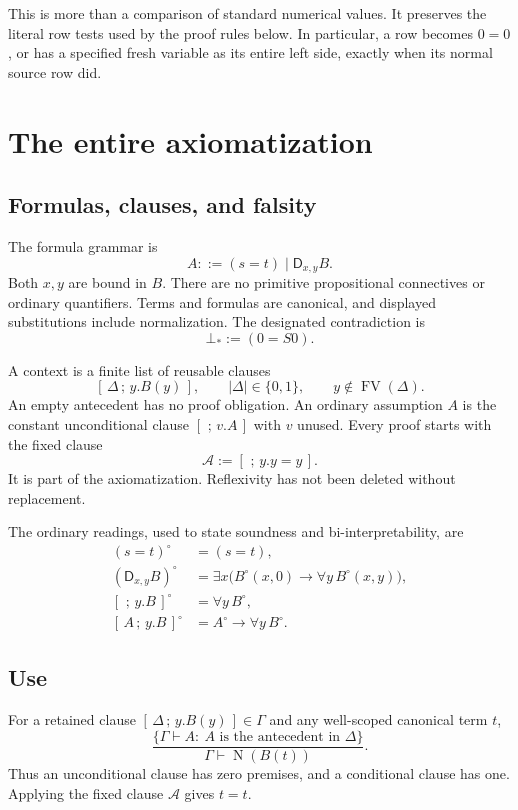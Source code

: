 \documentclass[11pt]{article}
\theoremstyle{definition}
\theoremstyle{remark}
\newcommand{\D}{\mathsf D}
\newcommand{\NF}{\operatorname{N}}
\newcommand{\FV}{\operatorname{FV}}
\newcommand{\der}{\vdash}
\newcommand{\cl}[2]{[\,#1\,;\,#2\,]}
\begin{document}
This is more than a comparison of standard numerical values.
It preserves the literal row tests used by the proof rules
below. In particular, a row becomes $0=0$, or has a specified
fresh variable as its entire left side, exactly when its
normal source row did.

\section{The entire axiomatization}
\label{sec:rules}

\subsection{Formulas, clauses, and falsity}

The formula grammar is
\[
 A::=(s=t)\mid \D_{x,y}B.
\]
Both $x,y$ are bound in $B$. There are no primitive
propositional connectives or ordinary quantifiers.
Terms and formulas are canonical, and displayed substitutions
include normalization. The designated contradiction is
\[
 \bot_*:=(0=S0).
 \]

A context is a finite list of reusable clauses
\[
 \cl{\Delta}{y.B(y)},\qquad |\Delta|\in\{0,1\},\qquad
 y\notin\FV(\Delta).
\]
An empty antecedent has no proof obligation. An ordinary
assumption $A$ is the constant unconditional clause
$\cl{}{v.A}$ with $v$ unused. Every proof starts with the
fixed clause
\[
 \mathcal A:=\cl{}{y.y=y}.
 \tag{Ax}
\]
It is part of the axiomatization. Reflexivity has not been
deleted without replacement.

The ordinary readings, used to state soundness and
bi-interpretability, are
\begin{align}
 (s=t)^\circ&=(s=t),\\
 (\D_{x,y}B)^\circ
   &=\exists x\bigl(B^\circ(x,0)\to\forall y\,B^\circ(x,y)\bigr),
   \label{eq:dreading}\\
 \cl{}{y.B}^\circ&=\forall y\,B^\circ,\\
 \cl{A}{y.B}^\circ&=A^\circ\to\forall y\,B^\circ.
\end{align}

\subsection{Use}

For a retained clause $\cl{\Delta}{y.B(y)}\in\Gamma$ and
any well-scoped canonical term $t$,
\[
 \frac{\{\Gamma\der A:\ A\text{ is the antecedent in }\Delta\}}
      {\Gamma\der \NF(B(t))}.
 \tag{Use}
\]
Thus an unconditional clause has zero premises, and a
conditional clause has one. Applying the fixed clause
$\mathcal A$ gives $t=t$.
\end{document}
